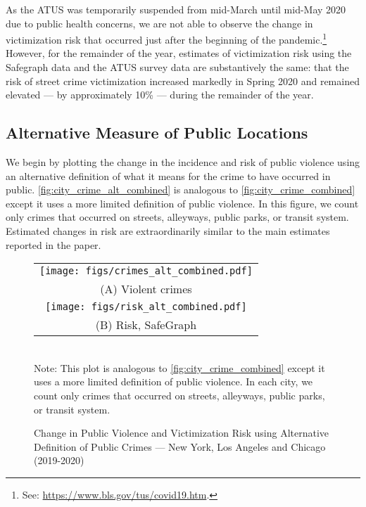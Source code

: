 As the ATUS was temporarily suspended from mid-March until mid-May 2020 due to public health concerns, we are not able to observe the change in victimization risk that occurred just after the beginning of the pandemic.\footnote{See: \url{https://www.bls.gov/tus/covid19.htm}.} However, for the remainder of the year, estimates of victimization risk using the Safegraph data and the ATUS survey data are substantively the same: that the risk of street crime victimization increased markedly in Spring 2020 and remained elevated --- by approximately 10\% --- during the remainder of the year.

 
\subsection{Alternative Measure of Public Locations}

We begin by plotting the change in the incidence and risk of public violence using an alternative definition of what it means for the crime to have occurred in public.  \autoref{fig:city_crime_alt_combined} is analogous to \autoref{fig:city_crime_combined} except it uses a more limited definition of public violence. In this figure, we count only crimes that occurred on streets, alleyways, public parks, or transit system. Estimated changes in risk are extraordinarily similar to the main estimates reported in the paper.

\begin{figure}[h!]
    \caption{Change in Public Violence and Victimization Risk using Alternative Definition of Public Crimes --- New York, Los Angeles and Chicago (2019-2020)}
     \begin{center}
     \begin{tabular}{c}
     \texttt{[image: figs/crimes\_alt\_combined.pdf]} \\ 
     (A) Violent crimes \\ 
     \texttt{[image: figs/risk\_alt\_combined.pdf]} \\ 
     (B) Risk, SafeGraph \\ 
    \end{tabular}
         \end{center}
    \label{fig:city_crime_alt_combined}
    \vspace*{0.5cm}  \\ 
        \newline 
    Note: This plot is analogous to \autoref{fig:city_crime_combined} except it uses a more limited definition of public violence. In each city, we count only crimes that occurred on streets, alleyways, public parks, or transit system. 
\end{figure}

